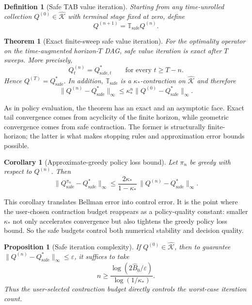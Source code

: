 \documentclass{article}
\newtheorem{theorem}{Theorem}[section]
\newtheorem{proposition}[proposition]{Proposition}
\newtheorem{corollary}[corollary]{Corollary}
\newtheorem{definition}[definition]{Definition}
\theoremstyle{remark}
\newcommand{\safe}{\mathrm{safe}}
\newcommand{\Ksafe}{\widehat{\mathcal K}}
\newcommand{\Bhat}{\widehat B}
\begin{document}
\begin{definition}[Safe TAB value iteration]
\label{def:lse-vi}
Starting from any time-unrolled collection $Q^{(0)}\in\Ksafe$ with terminal stage fixed at zero, define
\begin{equation}
Q^{(n+1)} = \mathbb T_\safe Q^{(n)}.
\label{eq:safe-vi}
\end{equation}
\end{definition}

\begin{theorem}[Exact finite-sweep safe value iteration]
\label{thm:vi-convergence}
For the optimality operator on the time-augmented horizon-$T$ DAG, safe value iteration is exact after $T$ sweeps.
More precisely,
\[
Q_t^{(n)} = Q_{\safe,t}^*
\qquad \text{for every } t\ge T-n.
\]
Hence $Q^{(T)}=Q_\safe^*$.
In addition, $\mathbb T_\safe$ is a $\kappa_*$-contraction on $\Ksafe$ and therefore
\begin{equation}
\|Q^{(n)}-Q_\safe^*\|_\infty
\le
\kappa_*^n\|Q^{(0)}-Q_\safe^*\|_\infty.
\label{eq:safe-vi-rate}
\end{equation}
\end{theorem}

As in policy evaluation, the theorem has an exact and an asymptotic face.
Exact tail convergence comes from acyclicity of the finite horizon, while geometric convergence comes from safe contraction.
The former is structurally finite-horizon; the latter is what makes stopping rules and approximation error bounds possible.


\begin{corollary}[Approximate-greedy policy loss bound]
\label{cor:vi-policy-loss}
Let $\pi_n$ be greedy with respect to $Q^{(n)}$.
Then
\begin{equation}
\|Q_{\safe}^{\pi_n}-Q_\safe^*\|_\infty
\le
\frac{2\kappa_*}{1-\kappa_*}\,\|Q^{(n)}-Q_\safe^*\|_\infty.
\label{eq:safe-vi-policy-bound}
\end{equation}
\end{corollary}

This corollary translates Bellman error into control error.
It is the point where the user-chosen contraction budget reappears as a policy-quality constant: smaller $\kappa_*$ not only accelerates convergence but also tightens the greedy policy loss bound.
So the safe budgets control both numerical stability and decision quality.


\begin{proposition}[Safe iteration complexity]
\label{prop:vi-complexity}
If $Q^{(0)}\in\Ksafe$, then to guarantee $\|Q^{(n)}-Q_\safe^*\|_\infty \le \varepsilon$, it suffices to take
\begin{equation}
n \ge \frac{\log(2\Bhat_0/\varepsilon)}{\log(1/\kappa_*)}.
\label{eq:safe-vi-iter-count}
\end{equation}
Thus the user-selected contraction budget directly controls the worst-case iteration count.
\end{proposition}
\end{document}
